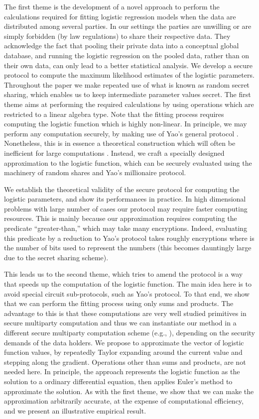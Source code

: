 \documentclass[11pt]{article}
\begin{document}
The first theme is the development of a novel approach to perform the calculations required for fitting logistic regression models when the data are distributed among several parties. In our settings the parties are unwilling or are simply forbidden (by law regulations) to share their respective data. They acknowledge the fact that pooling their private data into a conceptual global database, and running the logistic regression on the pooled data, rather than on their own data, can only lead to a better statistical analysis. We develop a secure protocol to compute the maximum likelihood estimates of the logistic parameters. Throughout the paper we make repeated use of what is known as random secret  sharing, which enables us to keep intermediate parameter values secret. The first theme aims at performing the required calculations by using operations which are restricted to a linear algebra type. Note that the fitting process requires computing the logistic function which is highly non-linear.
In principle, we may perform  any computation securely, by making use of Yao's general protocol \cite{yao82}.  Nonetheless, this is in essence a theoretical construction which will often be inefficient for large computations \cite{ppdm_book}. Instead, we craft a specially designed approximation to the logistic function, which can be securely evaluated using the machinery of random shares and Yao's millionaire protocol.

We establish the theoretical validity of the secure protocol for computing the logistic parameters, and show its performances in practice. In high dimensional problems with large number of cases our protocol may require faster computing resources. This is mainly because our approximation requires computing the predicate ``greater-than,'' which may take many encryptions. Indeed, evaluating this predicate by a reduction to Yao's protocol takes roughly  encryptions where  is the number of bits used to represent the numbers (this becomes dauntingly large due to the secret sharing scheme).

This leads us to the second theme, which tries to amend the protocol is a way that speeds up the computation of the logistic function. The main idea here is to avoid special circuit sub-protocols, such as  Yao's protocol. To that end, we show that we can perform the fitting process  using only sums and products. The advantage to this  is that these computations are very well studied primitives in secure multiparty computation and thus we can instantiate our method in a different secure multiparty computation scheme (e.g., \cite{ppdm_book, goldreich}), depending on the security demands of the data holders. We propose to approximate the vector of logistic function values, by repeatedly Taylor expanding around the current value and stepping along the gradient. Operations other than sums and products, are not needed here.   In principle, the approach represents the logistic function as the solution to a ordinary differential equation, then applies Euler's method to approximate the solution. As with the first theme, we show that we can make  the approximation arbitrarily accurate, at the expense of computational efficiency, and we present an illustrative empirical result.
\end{document}
